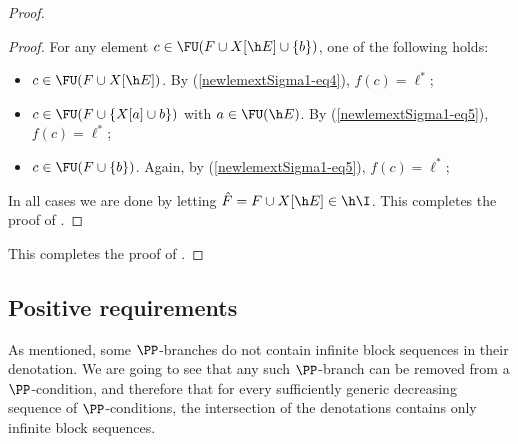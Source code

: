 \documentclass{article}
\numberwithin{theorem}{section}
\begin{document}
\begin{proof}
\begin{proof}
For any element $c \in \FU(F \cup X[\h E] \cup \{b\})$, one of the following holds:
\begin{itemize}
    \item[(i)] $c \in \FU(F \cup X[\h E])$. By (\ref{newlemextSigma1-eq4}), $f(c) = \ell^*$;
    \item[(ii)] $c \in \FU(F \cup \{X[a] \cup b\})$ with $a \in \FU(\h E)$. By (\ref{newlemextSigma1-eq5}), $f(c) = \ell^*$;
    \item[(iii)] $c \in \FU(F \cup \{b\})$. Again, by (\ref{newlemextSigma1-eq5}), $f(c) = \ell^*$;
\end{itemize}
In all cases we are done by letting $\hat F = F \cup X[\h E] \in \h \I$.
This completes the proof of .
\end{proof}
This completes the proof of .
\end{proof}

\subsection{Positive requirements}

As mentioned, some $\PP$-branches do not contain infinite block sequences in their denotation.
We are going to see that any such $\PP$-branch can be removed from a $\PP$-condition, and therefore that for every sufficiently generic decreasing sequence of $\PP$-conditions, the intersection of the denotations contains only infinite block sequences.
\end{document}
